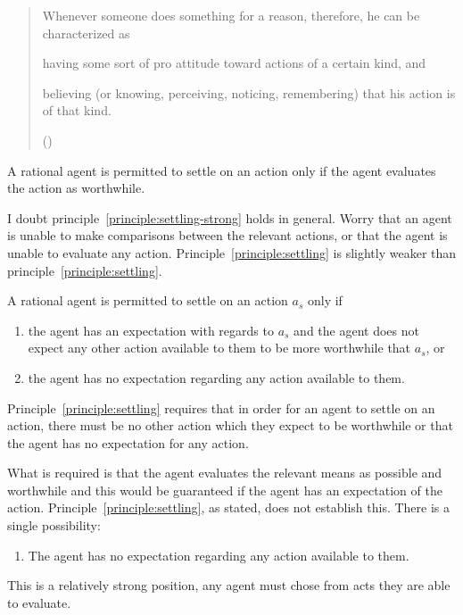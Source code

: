 \documentclass[10pt]{article}
\newcommand{\hozlinedash}[0]{%
  \noindent\hdashrule[0.5ex][c]{\textwidth}{.1pt}{2.5pt}
}
\begin{document}
\begin{quote}
  Whenever someone does something for a reason, therefore, he can be characterized as
  \begin{enumerate*}[label=(\alph*), ref=(\alph*)]
  \item\label{davidson:a} having some sort of pro attitude toward actions of a certain kind, and
  \item\label{davidson:b} believing (or knowing, perceiving, noticing, remembering) that his action is of that kind.
  \end{enumerate*}
  \mbox{}\hfill\mbox{(\citeyear[686--686]{Davidson:1963aa})}
\end{quote}


\begin{principle}\label{principle:settling-strong}
  A rational agent is permitted to settle on an action only if the agent evaluates the action as worthwhile.
\end{principle}

\hozlinedash


I doubt principle~\ref{principle:settling-strong} holds in general.
Worry that an agent is unable to make comparisons between the relevant actions, or that the agent is unable to evaluate any action.
Principle~\ref{principle:settling} is slightly weaker than principle~\ref{principle:settling}.

\begin{principle}[Settling]\label{principle:settling}
  A rational agent is permitted to settle on an action \(a_{s}\) only if
  \begin{enumerate}
  \item the agent has an expectation with regards to \(a_{s}\) and the agent does not expect any other action available to them to be more worthwhile that \(a_{s}\), or
  \item the agent has no expectation regarding any action available to them.
  \end{enumerate}
\end{principle}

Principle~\ref{principle:settling} requires that in order for an agent to settle on an action, there must be no other action which they expect to be worthwhile or that the agent has no expectation for any action.









What is required is that the agent evaluates the relevant means as possible and worthwhile and this would be guaranteed if the agent has an expectation of the action.
Principle~\ref{principle:settling}, as stated, does not establish this.
There is a single possibility:
\begin{enumerate}
\item The agent has no expectation regarding any action available to them.
\end{enumerate}
This is a relatively strong position, any agent must chose from acts they are able to evaluate.
\end{document}
